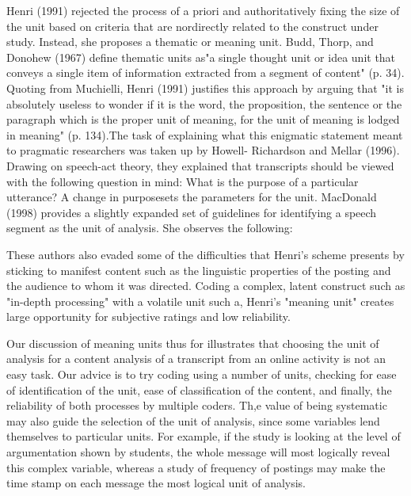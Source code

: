 \noindent Henri (1991) rejected the process of a priori and authoritatively fixing the size of the unit based on criteria that are nordirectly related to the construct under study. Instead, she proposes a thematic or meaning unit. Budd, Thorp, and Donohew (1967) define thematic units as"a single thought unit or idea unit that conveys a single item of infor­mation extracted from a segment of content" (p. 34). Quoting from Muchielli, Henri (1991) justifies this approach by arguing that "it is absolutely useless to wonder if it is the word, the proposition, the sentence or the paragraph which is the proper unit of meaning, for the unit of meaning is lodged in meaning" (p. 134).The task of explain­ing what this enigmatic statement meant to pragmatic researchers was taken up by Howell- Richardson and Mellar (1996). Drawing on speech-act theory, they explained that transcripts should be viewed with the following question in mind: What is the purpose of a particular utterance? A change in purposesets the parameters for the unit. MacDonald (1998) provides a slightly expanded set of guidelines for identifying a speech segment as the unit of analysis. She observes the following:\\

\begin{adjustwidth}{1cm}{}
{These authors also evaded some of the difficulties that Henri's scheme presents by sticking to manifest content such as the linguistic properties of the posting and the audi­ence to whom it was directed. Coding a complex, latent construct such as "in-depth processing" with a volatile unit such a, Henri's "meaning unit" creates large opportu­nity for subjective ratings and low reliability.}\\
\end{adjustwidth}

\noindent Our discussion of meaning units thus for illustrates that choosing the unit of analysis for a content analysis of a transcript from an online activity is not an easy task. Our advice is to try coding using a number of units, checking for ease of identification of the unit, ease of classification of the content, and finally, the reliability of both processes
by multiple coders. Th,e value of being systematic may also guide the selection of the
unit of analysis, since some variables lend themselves to particular units. For example, if the study is looking at the level of argumentation shown by students, the whole mes­sage will most logically reveal this complex variable, whereas a study of frequency of postings may make the time stamp on each message the most logical unit of analysis.

\newpage
















